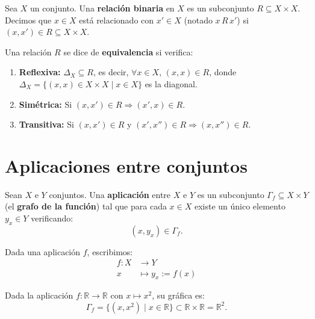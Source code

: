 Sea $X$ un conjunto. Una \textbf{relación binaria} en $X$ es un subconjunto $R \subseteq X \times X$. Decimos que $x \in X$ está relacionado con $x' \in X$ (notado $x \, R \, x'$) si $(x, x') \in R \subseteq X \times X$.

\begin{defi}
Una relación $R$ se dice de \textbf{equivalencia} si verifica:
\begin{enumerate}
    \item[\textbf{a)}] \textbf{Reflexiva:} $\Delta_X \subseteq R$, es decir, $\forall x \in X$, $(x, x) \in R$, donde $\Delta_X = \{(x, x) \in X \times X \mid x \in X\}$ es la diagonal.
    \item[\textbf{b)}] \textbf{Simétrica:} Si $(x, x') \in R \Rightarrow (x', x) \in R$.
    \item[\textbf{c)}] \textbf{Transitiva:} Si $(x, x') \in R$ y $(x', x'') \in R \Rightarrow (x, x'') \in R$.
\end{enumerate}
\end{defi}

\section{Aplicaciones entre conjuntos}

\begin{defi}
Sean $X$ e $Y$ conjuntos. Una \textbf{aplicación} entre $X$ e $Y$ es un subconjunto $\Gamma_f \subseteq X \times Y$ (el \textbf{grafo de la función}) tal que para cada $x \in X$ existe un único elemento $y_x \in Y$ verificando:
$$
    (x, y_x) \in \Gamma_f \text{}.
$$
\end{defi}

\begin{nota}
Dada una aplicación $f$, escribimos:
$$
    \begin{aligned}
        f \colon X &\longrightarrow Y \text{} \\
        x &\longmapsto y_x := f(x) \text{}
    \end{aligned}
$$
\end{nota}

\begin{ejem}
Dada la aplicación $f \colon \mathbb{R} \to \mathbb{R}$ con $x \mapsto x^2$, su gráfica es:
$$
    \Gamma_f = \{(x, x^2) \mid x \in \mathbb{R}\} \subset \mathbb{R} \times \mathbb{R} = \mathbb{R}^2 \text{}.
$$
\end{ejem}


